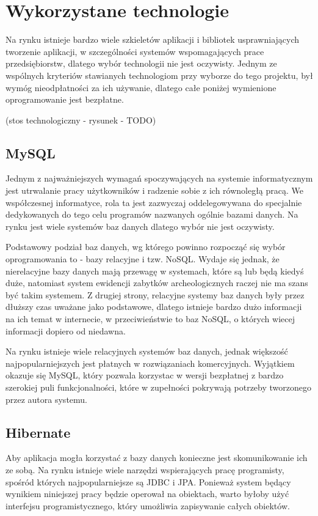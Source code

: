 \chapter{Wykorzystane technologie}
Na rynku istnieje bardzo wiele szkieletów aplikacji i bibliotek usprawniających tworzenie aplikacji, w szczególności systemów wspomagających prace przedsiębiorstw, dlatego wybór technologii nie jest oczywisty. Jednym ze wspólnych kryteriów stawianych technologiom przy wyborze do tego projektu, był wymóg nieodpłatności za ich używanie, dlatego całe poniżej wymienione oprogramowanie jest bezpłatne.

(stos technologiczny - rysunek - TODO)

\section{MySQL}
Jednym z najważniejszych wymagań spoczywających na systemie informatycznym jest utrwalanie pracy użytkowników i radzenie sobie z ich równoległą pracą. We współczesnej informatyce, rola ta jest zazwyczaj oddelegowywana do specjalnie dedykowanych do tego celu programów nazwanych ogólnie bazami danych. Na rynku jest wiele systemów baz danych dlatego wybór nie jest oczywisty.

Podstawowy podział baz danych, wg którego powinno rozpocząć się wybór oprogramowania to - bazy relacyjne i tzw. NoSQL. Wydaje się jednak, że nierelacyjne bazy danych mają przewagę w systemach, które są lub będą kiedyś duże, natomiast system ewidencji zabytków archeologicznych raczej nie ma szans być takim systemem. Z drugiej strony, relacyjne systemy baz danych były przez dłuższy czas uważane jako podstawowe, dlatego istnieje bardzo dużo informacji na ich temat w internecie, w przeciwieństwie to baz NoSQL, o których wiecej informacji dopiero od niedawna.

Na rynku istnieje wiele relacyjnych systemów baz danych, jednak większość najpopularniejszych jest płatnych w rozwiązaniach komercyjnych. Wyjątkiem okazuje się MySQL, który pozwala korzystac w wersji bezpłatnej z bardzo szerokiej puli funkcjonalności, które w zupełności pokrywają potrzeby tworzonego przez autora systemu.
\newpage
\section{Hibernate}
Aby aplikacja mogła korzystać z bazy danych konieczne jest skomunikowanie ich ze sobą. Na rynku istnieje wiele narzędzi wspierających pracę programisty, spośród których najpopularniejsze są JDBC i JPA. Ponieważ system będący wynikiem niniejszej pracy będzie operował na obiektach, warto byłoby użyć interfejsu programistycznego, który umożliwia zapisywanie całych obiektów.

